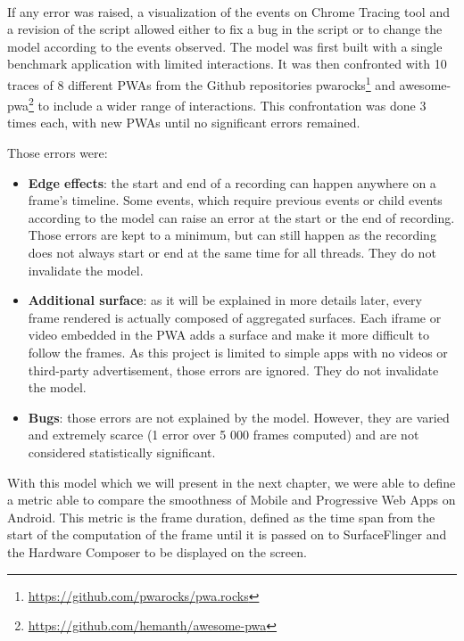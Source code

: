 \documentclass{kththesis}
\begin{document}
    \paragraph{}
    If any error was raised, a visualization of the events on Chrome Tracing tool and a revision of the script allowed either to fix a bug in the script or to change the model according to the events observed. \newline
    The model was first built with a single benchmark application with limited interactions. It was then confronted with 10 traces of 8 different PWAs from the Github repositories pwarocks\footnote{\url{https://github.com/pwarocks/pwa.rocks}} and awesome-pwa\footnote{\url{https://github.com/hemanth/awesome-pwa}} to include a wider range of interactions. This confrontation was done 3 times each, with new PWAs until no significant errors remained.
    
    Those errors were:
    \begin{itemize}
        \item \textbf{Edge effects}: the start and end of a recording can happen anywhere on a frame's timeline. Some events, which require previous events or child events according to the model can raise an error at the start or the end of recording. Those errors are kept to a minimum, but can still happen as the recording does not always start or end at the same time for all threads. They do not invalidate the model.
        \item \textbf{Additional surface}: as it will be explained in more details later, every frame rendered is actually composed of aggregated surfaces. Each iframe or video embedded in the PWA adds a surface and make it more difficult to follow the frames. As this project is limited to simple apps with no videos or third-party advertisement, those errors are ignored. They do not invalidate the model.
        \item \textbf{Bugs}: those errors are not explained by the model. However, they are varied and extremely scarce (1 error over 5 000 frames computed) and are not considered statistically significant.
    \end{itemize}
    
With this model which we will present in the next chapter, we were able to define a metric able to compare the smoothness of Mobile and Progressive Web Apps on Android. This metric is the frame duration, defined as the time span from the start of the computation of the frame until it is passed on to SurfaceFlinger and the Hardware Composer to be displayed on the screen.
\end{document}

